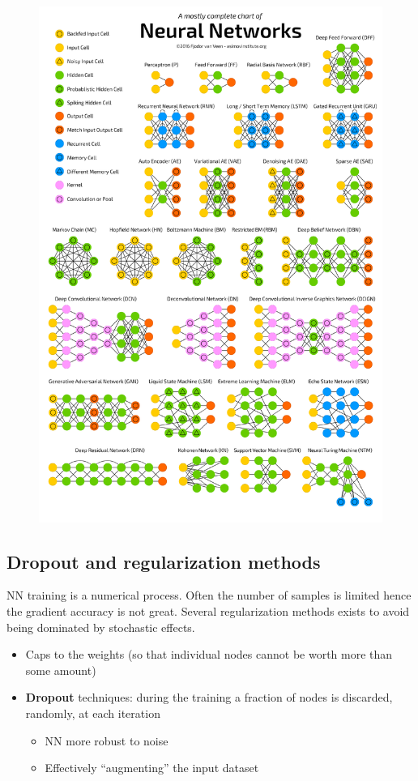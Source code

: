 \begin{figure}[ht]
	\centering
	\includegraphics[width=0.85\linewidth]{figure_ml/mcc_NN}
\end{figure}
\FloatBarrier

\newpage

\subsection{Dropout and regularization methods}

NN training is a numerical process. Often the number of samples is limited hence the gradient accuracy is not great. Several regularization methods exists to avoid being dominated by stochastic effects.
\begin{itemize}
	\item Caps to the weights (so that individual nodes cannot be worth more than some amount)
	\item \textbf{Dropout} techniques: during the training a fraction of nodes
	is discarded, randomly, at each iteration
	\begin{itemize}
		\item NN more robust to noise
		\item Effectively “augmenting” the input dataset
	\end{itemize}
\end{itemize}


